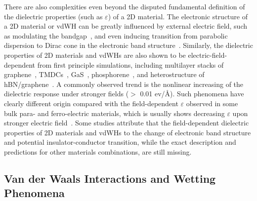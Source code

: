 %
There are also
complexities even beyond the disputed fundamental definition of the dielectric
properties (such as $\varepsilon$) of a 2D material.
%
The electronic structure of a 2D material or vdWH can be greatly
influenced by external electric field, such as modulating the
bandgap~\cite{Kumar_2016_PRB,Kumar_2016_jpcc,Li_2014_phosphorene_Efield},
and even inducing transition from parabolic dispersion to Dirac cone
in the electronic band structure~\cite{Liu_2015_aniso_dirac}.
%
Similarly, the dielectric properties of 2D materials and vdWHs are
also shown to be electric-field-dependent from first principle
simulations,
%
including multilayer stacks of
graphene~\cite{Santos_2013_tunable_eps_gr},
TMDCs~\cite{Santos_2013_ACSnano_kaxi}, GaS~\cite{Li_2015_GaS}, phosphorene~\cite{Kumar_2016_PRB}, and
heterostructure of hBN/graphene~\cite{Kumar_2016_jpcc}.
%
A commonly
observed trend is the nonlinear increasing of the dielectric response
under stronger fields ($>$ 0.01 ev/\AA{}).
%
Such phenomena have clearly different origin compared with the
field-dependent $\varepsilon$ observed in some bulk para- and
ferro-electric materials, which is usually shows decreasing
$\varepsilon$ upon stronger electric
field~\cite{Hemberger_1995_bulk_dielectric_efield,Maiti_2006_bulk_eps_batio3}.
%
Some studies attribute that the field-dependent dielectric properties
of 2D materials and vdWHs to the change of electronic band structure
and potential insulator-conductor transition, while the exact
description and predictions for other materials combinations, are
still missing.
%

\subsection{Van der Waals Interactions and Wetting Phenomena}
\label{sec:van-der-waals}

